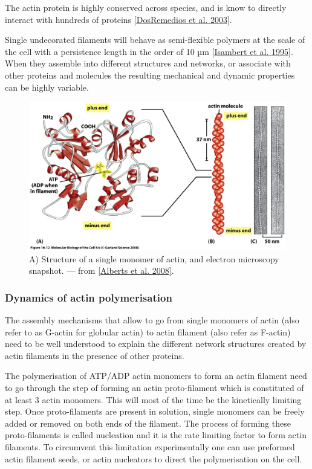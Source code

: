 \documentclass[A4paperpaper,11pt,english]{sphinxmanual}
\begin{document}
The actin protein is highly conserved across species, and is know to directly
interact with hundreds of proteins {\hyperref[index-latex:dosremedios2003]{{[}DosRemedios et al. 2003{]}}}.

Single undecorated filaments will behave  as
semi-flexible polymers at the scale of the cell with a persistence length in the order of 10 µm {\hyperref[index-latex:isambert1995]{{[}Isambert et al. 1995{]}}}. When they
assemble into different structures and networks, or associate with other proteins
and molecules the resulting mechanical and dynamic properties can be highly variable.
\begin{figure}[htbp]
\centering
\capstart

\includegraphics[width=0.700\linewidth]{actin-structure.jpg}
\caption{A) Structure of a single monomer of actin, and electron microscopy snapshot.
— from {\hyperref[index-latex:alberts2008]{{[}Alberts et al. 2008{]}}}.}\label{index-latex:fig-actin}\end{figure}


\subsubsection{Dynamics of actin polymerisation}
\label{index-latex:dynamics-of-actin-polymerisation}
The assembly mechanisms that allow to go from single monomers of actin (also
refer to as G-actin for globular actin) to actin filament (also refer as
F-actin) need to be well understood to explain the different network
structures created by actin filaments in the presence of other proteins.

The polymerisation of ATP/ADP actin monomers to form an actin filament need to
go through the step of forming an actin proto-filament which is constituted of
at least 3 actin monomers. This will most of the time be the kinetically
limiting step. Once proto-filaments are present in solution, single monomers
can be freely added or removed on both ends of the filament.  The process of
forming these proto-filaments is called nucleation and it is the rate limiting
factor to form actin filaments. To circumvent this
limitation experimentally one can use preformed actin filament seeds, or actin nucleators
to direct the polymerisation on the cell.
\end{document}
